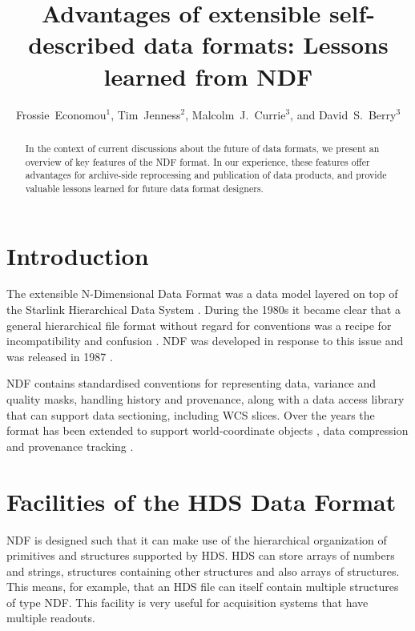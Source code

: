 \documentclass[11pt,twoside]{article}
\begin{document}
\title{Advantages of extensible self-described data formats: Lessons learned from NDF}
\author{Frossie~Economou$^1$, Tim~Jenness$^2$, Malcolm~J.~Currie$^3$,
and David~S.~Berry$^3$
}

\begin{abstract}
  In the context of current discussions about the future of data
  formats, we present an overview of key features of the NDF
  format. In our experience, these features offer advantages for
  archive-side reprocessing and publication of data products, and
  provide valuable lessons learned for future data format designers.
\end{abstract}

\section{Introduction}

The extensible N-Dimensional Data Format
\citep[NDF;][]{1993ASPC...52..229W,SGP38} was a data model layered on
top of the Starlink Hierarchical Data System
\citep[HDS;][]{1982QJRAS..23..485D}. During the 1980s it became clear
that a general hierarchical file format without regard for conventions
was a recipe for incompatibility and confusion \citep[see
e.g.][]{1993ASPC...52..219S}. NDF was developed in response to this
issue and was released in 1987 \citep[see
e.g.][]{1988STARB...2...11C}.

NDF contains standardised conventions for representing data,
variance and quality masks, handling history and provenance, along
with a data access library that can support data sectioning, including
WCS slices. Over the years the format has been extended to support
world-coordinate objects \citep{2001ASPC..238..129B}, data compression
\citep{2008ASPC..394..650C} and provenance tracking
\citep{2009ASPC..411..418J}.

\section{Facilities of the HDS Data Format}

NDF is designed such that it can make use of the hierarchical
organization of primitives and structures supported by HDS. HDS can
store arrays of numbers and strings, structures containing other
structures and also arrays of structures. This means, for example,
that an HDS file can itself contain multiple structures of type
NDF. This facility is very useful for acquisition systems that have
multiple readouts.
\end{document}
